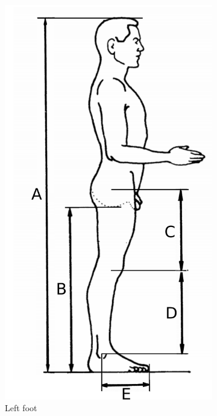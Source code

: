 \begin{figure}[h]
	\centering
	\begin{subfigure}[b]{0.3\textwidth}
        \includegraphics[width=\textwidth]{figures/din_measurements.pdf}
        \caption{Left foot}
        \label{fig:din1}
    \end{subfigure}
    \begin{subfigure}[b]{0.4\textwidth}

\end{subfigure}
\end{figure}
